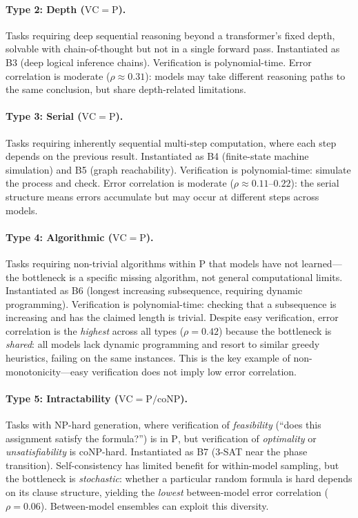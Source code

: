 \documentclass{article}
\theoremstyle{definition}
\theoremstyle{remark}
\newcommand{\PTIME}{\mathrm{P}}
\newcommand{\NP}{\mathrm{NP}}
\newcommand{\coNP}{\mathrm{coNP}}
\newcommand{\VC}{\mathrm{VC}}           %
\begin{document}
\paragraph{Type 2: Depth ($\VC = \PTIME$).}
Tasks requiring deep sequential reasoning beyond a transformer's fixed depth, solvable with chain-of-thought but not in a single forward pass. Instantiated as B3 (deep logical inference chains). Verification is polynomial-time. Error correlation is moderate ($\rho \approx 0.31$): models may take different reasoning paths to the same conclusion, but share depth-related limitations.

\paragraph{Type 3: Serial ($\VC = \PTIME$).}
Tasks requiring inherently sequential multi-step computation, where each step depends on the previous result. Instantiated as B4 (finite-state machine simulation) and B5 (graph reachability). Verification is polynomial-time: simulate the process and check. Error correlation is moderate ($\rho \approx 0.11\text{--}0.22$): the serial structure means errors accumulate but may occur at different steps across models.

\paragraph{Type 4: Algorithmic ($\VC = \PTIME$).}
Tasks requiring non-trivial algorithms within $\PTIME$ that models have not learned---the bottleneck is a specific missing algorithm, not general computational limits. Instantiated as B6 (longest increasing subsequence, requiring dynamic programming). Verification is polynomial-time: checking that a subsequence is increasing and has the claimed length is trivial.
Despite easy verification, error correlation is the \emph{highest} across all types ($\rho = 0.42$) because the bottleneck is \emph{shared}: all models lack dynamic programming and resort to similar greedy heuristics, failing on the same instances. This is the key example of non-monotonicity---easy verification does not imply low error correlation.

\paragraph{Type 5: Intractability ($\VC = \PTIME / \coNP$).}
Tasks with $\NP$-hard generation, where verification of \emph{feasibility} (``does this assignment satisfy the formula?'') is in $\PTIME$, but verification of \emph{optimality} or \emph{unsatisfiability} is $\coNP$-hard. Instantiated as B7 (3-SAT near the phase transition). Self-consistency has limited benefit for within-model sampling, but the bottleneck is \emph{stochastic}: whether a particular random formula is hard depends on its clause structure, yielding the \emph{lowest} between-model error correlation ($\rho = 0.06$). Between-model ensembles can exploit this diversity.
\end{document}
